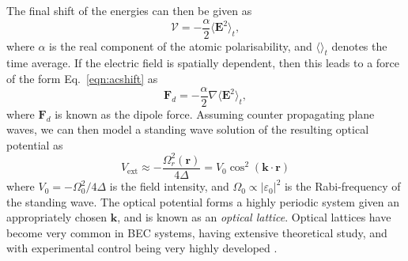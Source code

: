 The final shift of the energies can then be given as
\begin{equation}\label{eqn:acshift}
\mathcal{V} = -\frac{\alpha}{2}\langle \mathbf{E}^2\rangle_t ,
\end{equation}
where $\alpha$ is the real component of the atomic polarisability, and $\langle \rangle_t$ denotes the time average. If the electric field is spatially dependent, then this leads to a force of the form Eq.~\eqref{eqn:acshift} as
\begin{equation}
\mathbf{F}_d = -\frac{\alpha}{2}\nabla\langle \mathbf{E}^2 \rangle_t ,
\end{equation}
where $\mathbf{F}_d$ is known as the dipole force. Assuming counter propagating plane waves, we can then model a standing wave solution of the resulting optical potential as
\begin{equation}
    V_{\textrm{ext}} \approx -\frac{\Omega_r^2(\mathbf{r})}{4\Delta}  = V_0 \cos^2 (\mathbf{k} \cdot \mathbf{r})
\end{equation}
where $V_0 = -\Omega_0^2/4\Delta$ is the field intensity, and $\Omega_0 \propto |\varepsilon_0|^2$ is the Rabi-frequency of the standing wave. The optical potential forms a highly periodic system given an appropriately chosen $\mathbf{k}$, and is known as an \textit{optical lattice}. Optical lattices have become very common in BEC systems, having extensive theoretical study, and with experimental control being very highly developed \cite{OL:Greiner_nat_2002,OL:Reijnders_prl_2004,OL:Sorensen_prl_2005,Vtx:Tung_prl_2006,Vtx:Vignolo_pra_2007}.

